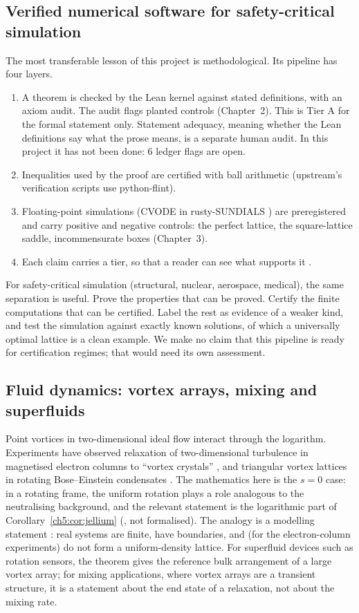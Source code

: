 \subsection{Verified numerical software for safety-critical simulation}

The most transferable lesson of this project is methodological. Its pipeline has four layers.
\begin{enumerate}[leftmargin=*]
\item A theorem is checked by the Lean kernel against stated definitions, with an axiom audit. The audit flags
  planted controls (Chapter~2). This is Tier A for the formal statement only. Statement adequacy, meaning whether the
  Lean definitions say what the prose means, is a separate human audit. In this project it has not been done: 6
  ledger flags are open.
\item Inequalities used by the proof are certified with ball arithmetic (upstream's verification scripts use
  python-flint).
\item Floating-point simulations (CVODE in rusty-SUNDIALS \cite{rusty}) are preregistered and carry positive and
  negative controls: the perfect lattice, the square-lattice saddle, incommensurate boxes (Chapter~3).
\item Each claim carries a tier, so that a reader can see what supports it \cite{elenchus}.
\end{enumerate}
For safety-critical simulation (structural, nuclear, aerospace, medical), the same separation is useful. Prove the
properties that can be proved. Certify the finite computations that can be certified. Label the rest as evidence
of a weaker kind, and test the simulation against exactly known solutions, of which a universally optimal lattice is
a clean example. We make no claim that this pipeline is ready for certification regimes; that would need its own
assessment.

\subsection{Fluid dynamics: vortex arrays, mixing and superfluids}

Point vortices in two-dimensional ideal flow interact through the logarithm. Experiments have observed relaxation of
two-dimensional turbulence in magnetised electron columns to ``vortex crystals'' \cite{fine}, and triangular vortex
lattices in rotating Bose--Einstein condensates \cite{aboshaeer}. The mathematics here is the $s=0$ case: in a
rotating frame, the uniform rotation plays a role analogous to the neutralising background, and the relevant
statement is the logarithmic part of Corollary~\ref{ch5:cor:jellium} (\tierL{}, not formalised). The analogy is a
modelling statement \tierC{}: real systems are finite, have boundaries, and (for the electron-column experiments) do
not form a uniform-density lattice. For superfluid devices such as rotation sensors, the theorem gives the reference
bulk arrangement of a large vortex array; for mixing applications, where vortex arrays are a transient structure,
it is a statement about the end state of a relaxation, not about the mixing rate.

